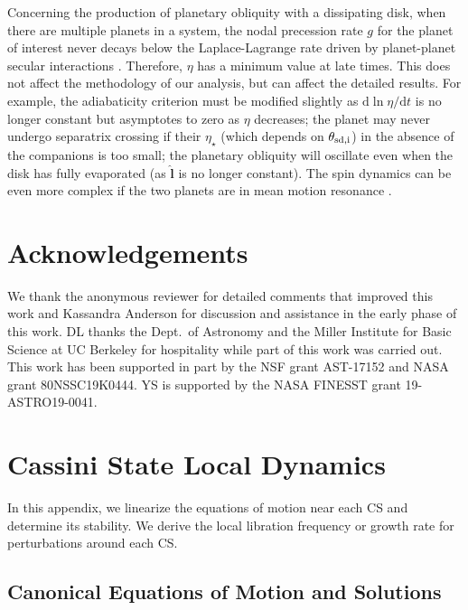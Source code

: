 \documentclass[twocolumn,twocolappendix]{aastex63}
\newcommand*{\rdil}[2]{\mathrm{d}#1 / \mathrm{d}#2}
\newcommand*{\bsmb}[1]{\boldsymbol{\mathbf{#1}}}
\newcommand*{\uv}[1]{\hat{\bsmb{#1}}}
\begin{document}
\textcolor{Corr}{Concerning the production of planetary obliquity with a
dissipating disk, when there are multiple planets in a system, the nodal
precession rate $g$ for the planet of interest never decays below the
Laplace-Lagrange rate driven by planet-planet secular interactions
\citep{millholland_disk}. Therefore, $\eta$ has a minimum value at late times.
This does not affect the methodology of our analysis, but can affect the
detailed results. For example, the adiabaticity criterion must be modified
slightly as $\rdil{\ln \eta}{t}$ is no longer constant but asymptotes to zero as
$\eta$ decreases; the planet may never undergo separatrix crossing if their
$\eta_{\star}$ (which depends on $\theta_{\rm sd, i}$) in the absence of the
companions is too small; the planetary obliquity will oscillate even when the
disk has fully evaporated (as $\uv{l}$ is no longer constant). The spin dynamics
can be even more complex if the two planets are in mean motion resonance
\citep[e.g.][]{millholland2019obliquity}.}

\section*{Acknowledgements}

We thank \textcolor{Corr}{the anonymous reviewer for detailed comments that
improved this work and} Kassandra Anderson for discussion and assistance in the
early phase of this work. DL thanks the Dept.\ of Astronomy and the Miller
Institute for Basic Science at UC Berkeley for hospitality while part of this
work was carried out. This work has been supported in part by the NSF grant
AST-17152 and NASA grant 80NSSC19K0444. YS is supported by the NASA FINESST
grant 19-ASTRO19-0041.%




\appendix

\section{Cassini State Local Dynamics}\label{s:local_dynamics}

In this appendix, we linearize the equations of motion near each CS and
determine its stability. We derive the local libration frequency or growth
rate for perturbations around each CS\@.

\subsection{Canonical Equations of Motion and Solutions}\label{ss:canonical}
\end{document}
